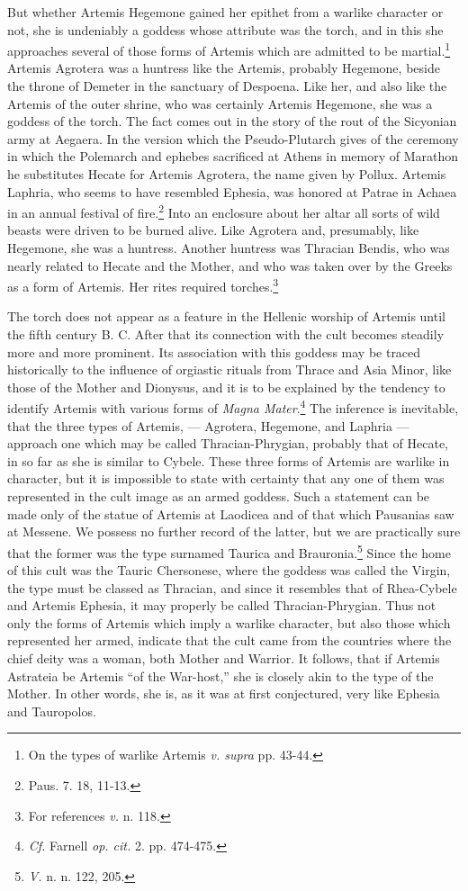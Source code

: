 \documentclass[a4paper, 12pt, oneside]{article}
\begin{document}
But whether Artemis Hegemone gained her epithet from a warlike character or not, she is undeniably a goddess whose attribute was the torch, and in this she approaches several of those forms of Artemis which are admitted to be martial.\footnote{On the types of warlike Artemis \emph{v. supra} pp. 43-44.} Artemis Agrotera was a huntress like the Artemis, probably Hegemone, beside the throne of Demeter in the sanctuary of Despoena. Like her, and also like the Artemis of the outer shrine, who was certainly Artemis Hegemone, she was a goddess of the torch. The fact comes out in the story of the rout of the Sicyonian army at Aegaera. In the version which the Pseudo-Plutarch gives of the ceremony in which the Polemarch and ephebes sacrificed at Athens in memory of Marathon he substitutes Hecate for Artemis Agrotera, the name given by Pollux. Artemis Laphria, who seems to have resembled Ephesia, was honored at Patrae in Achaea in an annual festival of fire.\footnote{Paus. 7. 18, 11-13.} Into an enclosure about her altar all sorts of wild beasts were driven to be burned alive. Like Agrotera and, presumably, like Hegemone, she was a huntress. Another huntress was Thracian Bendis, who was nearly related to Hecate and the Mother, and who was taken over by the Greeks as a form of Artemis. Her rites required torches.\footnote{For references \emph{v.} n. 118.}

The torch does not appear as a feature in the Hellenic worship of Artemis until the fifth century B. C. After that its connection with the cult becomes steadily more and more prominent. Its association with this goddess may be traced historically to the influence of orgiastic rituals from Thrace and Asia Minor, like those of the Mother and Dionysus, and it is to be explained by the tendency to identify Artemis with various forms of \emph{Magna Mater}.\footnote{\emph{Cf.} Farnell \emph{op. cit.} 2. pp. 474-475.} The inference is inevitable, that the three types of Artemis, --- Agrotera, Hegemone, and Laphria --- approach one which may be called Thracian-Phrygian, probably that of Hecate, in so far as she is similar to Cybele. These three forms of Artemis are warlike in character, but it is impossible to state with certainty that any one of them was represented in the cult image as an armed goddess. Such a statement can be made only of the statue of Artemis at Laodicea and of that which Pausanias saw at Messene. We possess no further record of the latter, but we are practically sure that the former was the type surnamed Taurica and Brauronia.\footnote{\emph{V.} n. n. 122, 205.} Since the home of this cult was the Tauric Chersonese, where the goddess was called the Virgin, the type must be classed as Thracian, and since it resembles that of Rhea-Cybele and Artemis Ephesia, it may properly be called Thracian-Phrygian. Thus not only the forms of Artemis which imply a warlike character, but also those which represented her armed, indicate that the cult came from the countries where the chief deity was a woman, both Mother and Warrior. It follows, that if Artemis Astrateia be Artemis ``of the War-host,'' she is closely akin to the type of the Mother. In other words, she is, as it was at first conjectured, very like Ephesia and Tauropolos.
\end{document}
